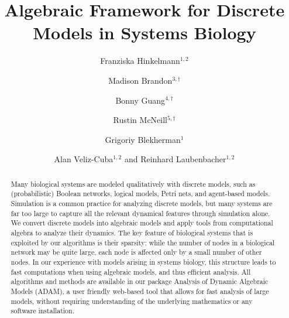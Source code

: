 \documentclass[11pt]{amsart}
\title{Algebraic Framework for Discrete Models in Systems Biology}
\author{Franziska Hinkelmann$^{1,2}$%
      \and
         Madison Brandon$^{3,\dagger}$%
		\and
         Bonny Guang$^{4,\dagger}$%
		\and
	     Rustin McNeill$^{5,\dagger}$%
		\and
         Grigoriy Blekherman$^1$%
		\and
         Alan Veliz-Cuba$^{1,2}$%
       and 
         Reinhard Laubenbacher$^{1,2}$%
      }
\begin{document}
\begin{abstract}
Many biological systems are modeled qualitatively with discrete models,
such as (probabilistic) Boolean networks, logical models, Petri nets,
and agent-based models.  Simulation is a common practice for analyzing
discrete models, but many systems are far too large to capture all the
relevant dynamical features through simulation alone.  
We convert discrete models into algebraic models and apply tools from computational algebra to analyze their dynamics.  The key feature of biological systems that is exploited by our algorithms is their sparsity: while the number of nodes in a biological network may be quite large, each node is affected only by a small number of other nodes. In our experience with models arising in systems biology, this structure leads to fast computations when using algebraic models, and thus efficient analysis.  
All algorithms and methods are available in our package Analysis of Dynamic
Algebraic Models (ADAM), a user friendly web-based tool that allows for fast
analysis of large models, without requiring understanding of the underlying
mathematics or any software installation. 
\end{abstract}

\maketitle
\end{document}
